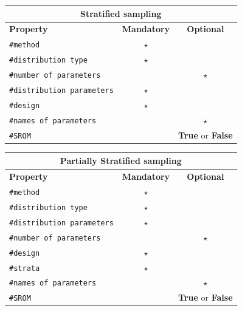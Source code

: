 \begin{center}
	\begin{tabular}{ |l|c|c| } 
		\hline
		\multicolumn{3}{|c|}{\textbf{Stratified sampling}} \\
		\hline
		\textbf{Property} & \textbf{Mandatory} & \textbf{Optional} \\
		\hline
		\texttt{\#method}& $\star$ &   \\ 
		\hline
		\texttt{\#distribution type}& $\star$ &   \\ 
		\hline
		\texttt{\#number of parameters}& &$\star$    \\ 
		\hline
		\texttt{\#distribution parameters} & $\star$ &   \\ 
		\hline
		\texttt{\#design}& $\star$ &    \\ 
		\hline
		\texttt{\#names of parameters}& & $\star$   \\ 
		\hline
				\texttt{\#SROM}&  & \textbf{True} or \textbf{False}    \\ 
		\hline
	\end{tabular}
\end{center}

\begin{center}
	\begin{tabular}{ |l|c|c| } 
		\hline
		\multicolumn{3}{|c|}{\textbf{Partially Stratified sampling}} \\
		\hline
		\textbf{Property} & \textbf{Mandatory} & \textbf{Optional} \\
		\hline
		\texttt{\#method}& $\star$ &   \\ 
		\hline
		\texttt{\#distribution type}& $\star$ &   \\ 
		\hline
		\texttt{\#distribution parameters} & $\star$ &   \\ 
		\hline
		\texttt{\#number of parameters}& &$\star$    \\ 
		\hline
		\texttt{\#design}& $\star$  &  \\ 
		\hline
		\texttt{\#strata}& $\star$ &   \\ 
		\hline
		\texttt{\#names of parameters}& & $\star$   \\ 
		\hline
				\texttt{\#SROM}&  & \textbf{True} or \textbf{False}    \\ 
		\hline
	\end{tabular}
\end{center}




